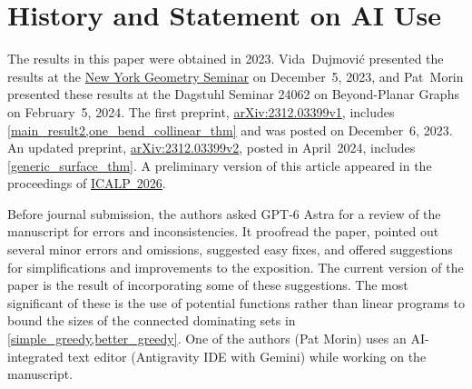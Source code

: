 \documentclass{patmorin}
\begin{document}
\section*{History and Statement on AI Use}
The results in this paper were obtained in 2023. Vida~Dujmović presented the results at the \href{https://math.nyu.edu/seminars/geometry/fall23/Dujmovic.html}{New York Geometry Seminar} on December~5, 2023, and Pat~Morin presented these results at the Dagstuhl Seminar 24062 on Beyond-Planar Graphs on February~5, 2024. The first preprint, \href{https://arxiv.org/abs/2312.03399v1}{arXiv:2312.03399v1}, includes \cref{main_result2,one_bend_collinear_thm} and was posted on December~6, 2023. An updated preprint, \href{https://arxiv.org/abs/2312.03399v2}{arXiv:2312.03399v2}, posted in April~2024, includes \cref{generic_surface_thm}.  A preliminary version of this article appeared in the proceedings of \href{https://doi.org/10.4230/LIPIcs.ICALP.2026.41}{ICALP~2026}.

Before journal submission, the authors asked GPT-6 Astra for a review of the manuscript for errors and inconsistencies. It proofread the paper, pointed out several minor errors and omissions, suggested easy fixes, and offered suggestions for simplifications and improvements to the exposition.  The current version of the paper is the result of incorporating some of these suggestions.  The most significant of these is the use of potential functions rather than linear programs to bound the sizes of the connected dominating sets in \cref{simple_greedy,better_greedy}. One of the authors (Pat Morin) uses an AI-integrated text editor (Antigravity IDE with Gemini) while working on the manuscript.




\end{document}
